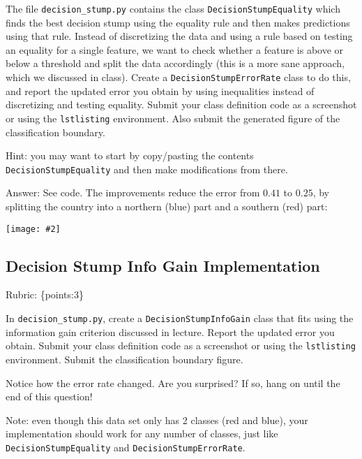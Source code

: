 \documentclass{article}
\def\ans#1{\par\gre{Answer: #1}}
\def\answer#1{\ans{#1}}
\def\rubric#1{\gre{Rubric: \{#1\}}}{}
\def\blu#1{{\color{blu}#1}}
\def\gre#1{{\color{gre}#1}}
\newcommand{\centerfig}[2]{\begin{center}\texttt{[image: \#2]}\end{center}}
\begin{document}
	The file \texttt{decision\string_stump.py} contains the class \texttt{DecisionStumpEquality} which 
	finds the best decision stump using the equality rule and then makes predictions using that
	rule. Instead of discretizing the data and using a rule based on testing an equality for 
	a single feature, we want to check whether a feature is above or below a threshold and 
	split the data accordingly (this is a more sane approach, which we discussed in class). 
	\blu{Create a \texttt{DecisionStumpErrorRate} class to do this, and report the updated error you 
		obtain by using inequalities instead of discretizing and testing equality. 
		Submit your class definition code as a screenshot or using the \texttt{lstlisting} environment.
		Also submit the generated figure of the classification boundary.}
	
	Hint: you may want to start by copy/pasting the contents \texttt{DecisionStumpEquality} and then make modifications from there. %
	
	\answer{
		See code.
		The improvements reduce the error from $0.41$ to $0.25$, by splitting the country into 
		a northern (blue) part and a southern (red) part:\\
		\centerfig{.7}{../figs/q6_2_decisionBoundary}
	}
	
	
	
	\subsection{Decision Stump Info Gain Implementation}
	\rubric{points:3}
	
	In \texttt{decision\string_stump.py}, \blu{create a \texttt{DecisionStumpInfoGain} class that 
		fits using the information gain criterion discussed in lecture. 
		Report the updated error you obtain.
		Submit your class definition code as a screenshot or using the \texttt{lstlisting} environment.
		Submit the classification boundary figure.}
	
	Notice how the error rate changed. Are you surprised? If so, hang on until the end of this question!
	
	Note: even though this data set only has 2 classes (red and blue), your implementation should work 
	for any number of classes, just like \texttt{DecisionStumpEquality} and \texttt{DecisionStumpErrorRate}.
	
\end{document}

